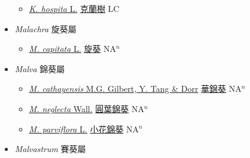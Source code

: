 \begin{itemize}
  \begin{itemize}
        \item[] \href{http://www.theplantlist.org/tpl1.1/search?q=Kleinhovia+hospita}{\textit{K. hospita} L.}   \href{\detokenize{http://taibnet.sinica.edu.tw/chi/taibnet_species_list.php?T2=克蘭樹&T2_new_value=true&fr=y}}{克蘭樹} LC
  \end{itemize}
 \item[] \textit{Malachra} 旋葵屬
                    
  \begin{itemize}
        \item[] \href{http://www.theplantlist.org/tpl1.1/search?q=Malachra+capitata}{\textit{M. capitata} L.}   \href{\detokenize{http://taibnet.sinica.edu.tw/chi/taibnet_species_list.php?T2=旋葵&T2_new_value=true&fr=y}}{旋葵} NA$^n$
  \end{itemize}
 \item[] \textit{Malva} 錦葵屬
                    
  \begin{itemize}
        \item[] \href{http://www.theplantlist.org/tpl1.1/search?q=Malva+cathayensis}{\textit{M. cathayensis} M.G. Gilbert, Y. Tang \& Dorr}     \href{\detokenize{http://taibnet.sinica.edu.tw/chi/taibnet_species_list.php?T2=華錦葵&T2_new_value=true&fr=y}}{華錦葵} NA$^n$
        \item[] \href{http://www.theplantlist.org/tpl1.1/search?q=Malva+neglecta}{\textit{M. neglecta} Wall.}   \href{\detokenize{http://taibnet.sinica.edu.tw/chi/taibnet_species_list.php?T2=圓葉錦葵&T2_new_value=true&fr=y}}{圓葉錦葵} NA$^n$
        \item[] \href{http://www.theplantlist.org/tpl1.1/search?q=Malva+parviflora}{\textit{M. parviflora} L.}   \href{\detokenize{http://taibnet.sinica.edu.tw/chi/taibnet_species_list.php?T2=小花錦葵&T2_new_value=true&fr=y}}{小花錦葵} NA$^n$
  \end{itemize}
 \item[] \textit{Malvastrum} 賽葵屬
                    

\end{itemize}
